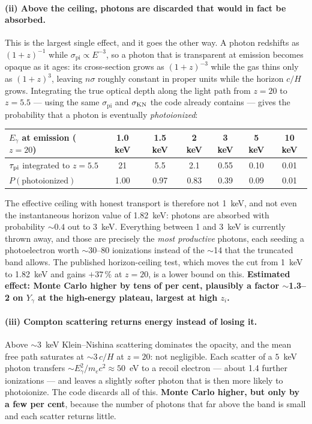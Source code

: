 \documentclass[11pt,a4paper]{article}
\newcommand{\Eg}{E_\gamma}
\newcommand{\spi}{\sigma_{\mathrm{pi}}}
\begin{document}
\paragraph{(ii) Above the ceiling, photons are discarded that would in fact be
absorbed.}  This is the largest single effect, and it goes the other way.  A
photon redshifts as $(1+z)^{-1}$ while $\spi\propto E^{-3}$, so a photon that
is transparent at emission becomes opaque as it ages: its cross-section grows
as $(1+z)^{-3}$ while the gas thins only as $(1+z)^{3}$, leaving $n\sigma$
roughly constant in proper units while the horizon $c/H$ grows.  Integrating
the true optical depth along the light path from $z=20$ to $z=5.5$ --- using
the same $\spi$ and $\sigma_{\rm KN}$ the code already contains --- gives the
probability that a photon is eventually \emph{photoionized}:

\begin{center}
\begin{tabular}{lcccccc}
\toprule
$\Eg$ at emission ($z=20$) & 1.0 keV & 1.5 keV & 2 keV & 3 keV & 5 keV & 10 keV \\
\midrule
$\tau_{\rm pi}$ integrated to $z=5.5$ & 21 & 5.5 & 2.1 & 0.55 & 0.10 & 0.01 \\
$P(\text{photoionized})$              & 1.00 & 0.97 & 0.83 & 0.39 & 0.09 & 0.01 \\
\bottomrule
\end{tabular}
\end{center}

The effective ceiling with honest transport is therefore not 1~keV, and not
even the instantaneous horizon value of 1.82~keV: photons are absorbed with
probability $\sim0.4$ out to 3~keV.  Everything between 1 and 3~keV is
currently thrown away, and those are precisely the \emph{most productive}
photons, each seeding a photoelectron worth $\sim$30--80 ionizations instead of
the $\sim$14 that the truncated band allows.  The published horizon-ceiling
test, which moves the cut from 1~keV to 1.82~keV and gains $+37\,\%$ at
$z=20$, is a lower bound on this.  \textbf{Estimated effect: Monte Carlo higher
by tens of per cent, plausibly a factor $\sim$1.3--2 on $Y_\gamma$ at the
high-energy plateau, largest at high $z_i$.}

\paragraph{(iii) Compton scattering returns energy instead of losing it.}
Above $\sim$3~keV Klein--Nishina scattering dominates the opacity, and the mean
free path saturates at $\sim3\,c/H$ at $z=20$: not negligible.  Each scatter
of a $5$~keV photon transfers $\sim\Eg^2/m_ec^2 \approx 50$~eV to a recoil
electron --- about 1.4 further ionizations --- and leaves a slightly softer
photon that is then more likely to photoionize.  The code discards all of this.
\textbf{Monte Carlo higher, but only by a few per cent}, because the number of
photons that far above the band is small and each scatter returns little.
\end{document}
